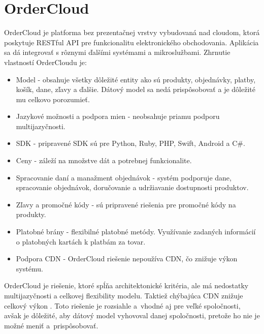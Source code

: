 \documentclass[
  printed, %
  table,   %
  lof,     %
  nolot,     %
  twoside,  
]{fithesis3}
\begin{document}
\section{OrderCloud}
OrderCloud je platforma bez prezentačnej vrstvy vybudovaná nad cloudom, ktorá poskytuje RESTful API pre funkcionalitu elektronického obchodovania. Aplikácia sa dá integrovať s rôznymi ďalšími systémami a mikroslužbami. Zhrnutie vlastností OrderCloudu je:
\begin{itemize}
	\item Model - obsahuje všetky dôležité entity ako sú produkty, objednávky, platby, košík, dane, zľavy a ďalšie. Dátový model sa nedá prispôsobovať a je dôležité mu celkovo porozumieť.
	\item Jazykové možnosti a podpora mien - neobsahuje priamu podporu multijazyčnosti.
	\item SDK - pripravené SDK sú pre Python, Ruby, PHP, Swift, Android a C\#.
	\item Ceny - záleží na množstve dát a potrebnej funkcionalite.
	\item Spracovanie daní a manažment objednávok - systém podporuje dane, spracovanie objednávok, doručovanie a udržiavanie dostupnosti produktov. 
	\item Zľavy a promočné kódy - sú pripravené riešenia pre promočné kódy na produkty.
	\item Platobné brány - flexibilné platobné metódy. Využívanie zadaných informácií o platobných kartách k platbám za tovar.
	\item Podpora CDN - OrderCloud riešenie nepoužíva CDN, čo znižuje výkon systému.
		\end{itemize}
OrderCloud je riešenie, ktoré spĺňa architektonické kritéria, ale má nedostatky multijazyčnosti a celkovej flexibility modelu. Taktiež chýbajúca CDN znižuje celkový výkon \cite{ordercloud}. Toto riešenie je rozsiahle a~vhodné aj pre veľké spoločnosti, avšak je dôležité, aby dátový model vyhovoval danej spoločnosti, pretože ho nie je možné meniť a~prispôsobovať.
\end{document}
